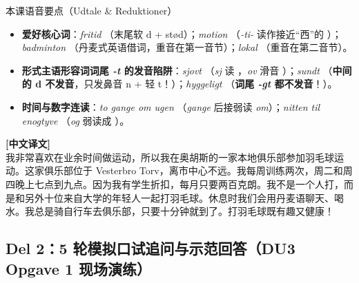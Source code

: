 \begin{tipbox}{本课语音要点（Udtale \& Reduktioner）}
\begin{itemize}
  \item \textbf{爱好核心词}：\textit{fritid} （末尾软 d + stød）；\textit{motion} （\textit{-ti-} 读作接近“西”的 ）；\textit{badminton} （丹麦式英语借词，重音在第一音节）；\textit{lokal} （重音在第二音节）。
  \item \textbf{形式主语形容词词尾 \textit{-t} 的发音陷阱}：\textit{sjovt} （\textit{sj} 读 ，\textit{ov} 滑音 ）；\textit{sundt} （\textbf{中间的 d 不发音}，只发鼻音 n + 轻 t！）；\textit{hyggeligt} （\textbf{词尾 \textit{-gt} 都不发音}！）。
  \item \textbf{时间与数字连读}：\textit{to gange om ugen} （\textit{gange} 后接弱读 \textit{om}）；\textit{nitten til enogtyve} （\textit{og} 弱读成 ）。
\end{itemize}
\end{tipbox}

\begin{transbox}
\small
\textbf{\color{NCDTeal}[中文译文]}\\
我非常喜欢在业余时间做运动，所以我在奥胡斯的一家本地俱乐部参加羽毛球运动。这家俱乐部位于 Vesterbro Torv，离市中心不远。我每周训练两次，周二和周四晚上七点到九点。因为我有学生折扣，每月只要两百克朗。我不是一个人打，而是和另外十位来自大学的年轻人一起打羽毛球。休息时我们会用丹麦语聊天、喝水。我总是骑自行车去俱乐部，只要十分钟就到了。打羽毛球既有趣又健康！
\end{transbox}

\subsection*{Del 2：5 轮模拟口试追问与示范回答（DU3 Opgave 1 现场演练）}


